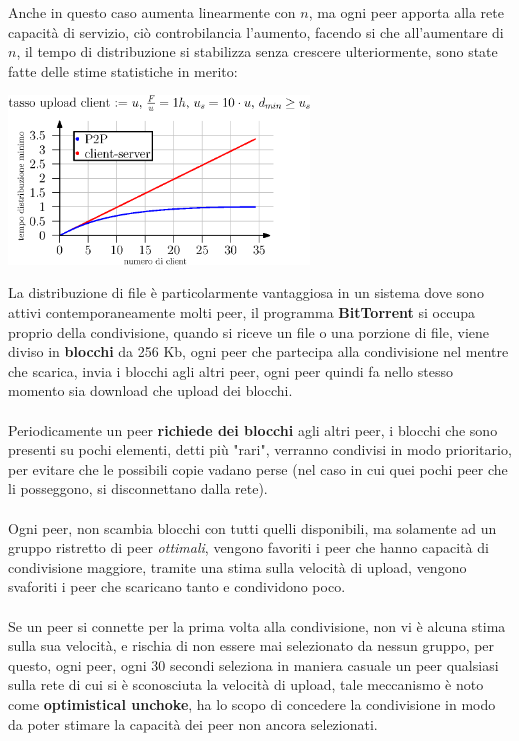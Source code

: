 \documentclass[12pt, letterpaper]{article}
\newcommand{\acc}{\\\hphantom{}\\}
\begin{document}
Anche in questo caso aumenta linearmente con $n$, ma ogni peer apporta alla rete capacità di servizio,
ciò controbilancia l'aumento, facendo si che all'aumentare di $n$, il tempo di distribuzione si stabilizza
senza crescere ulteriormente, sono state fatte delle stime statistiche in merito:\begin{center}
    \includegraphics[width=0.6\textwidth ]{images/p2pTime.eps}
\end{center}
La distribuzione di file è particolarmente vantaggiosa in un sistema dove sono attivi contemporaneamente
molti peer, il programma \textbf{BitTorrent} si occupa proprio della condivisione, quando si riceve un
file o una porzione di file, viene diviso in \textbf{blocchi} da 256 Kb, ogni peer che partecipa alla condivisione nel
mentre che scarica, invia i blocchi agli altri peer, ogni peer quindi fa nello stesso momento sia
download che upload dei blocchi.\acc
Periodicamente un peer \textbf{richiede dei blocchi} agli altri peer, i blocchi che sono presenti su pochi elementi, detti
più "rari", verranno condivisi in modo prioritario, per evitare che le possibili copie vadano perse (nel caso
in cui quei pochi peer che li posseggono, si disconnettano dalla rete).\acc
Ogni peer, non scambia blocchi con tutti quelli disponibili, ma solamente ad un gruppo ristretto di peer
\textit{ottimali}, vengono favoriti i peer che hanno capacità di condivisione maggiore, tramite una
stima sulla velocità di upload, vengono svaforiti i peer che
scaricano tanto e condividono poco.\acc
Se un peer si connette per la prima volta alla condivisione, non vi è alcuna stima sulla sua velocità, e rischia
di non essere mai selezionato da nessun gruppo, per questo, ogni peer, ogni 30 secondi seleziona in
maniera casuale un peer qualsiasi sulla rete di cui si è sconosciuta la
velocità di upload, tale meccanismo è noto come \textbf{optimistical unchoke},
ha lo scopo di concedere la condivisione in modo da poter stimare la capacità dei peer non ancora selezionati.
\end{document}
